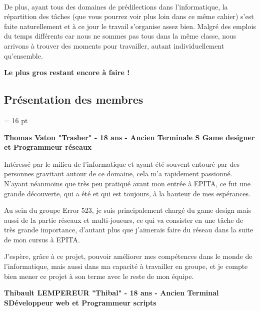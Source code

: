 \documentclass[12pt,a4paper]{article}
\begin{document}
\paragraph{}
De plus, ayant tous des domaines de prédilections dans l'informatique, la répartition des tâches (que vous pourrez voir plus loin dans ce même cahier) s'est faite naturellement et à ce jour le travail s'organise assez bien. Malgré des emplois du temps différents car nous ne sommes pas tous dans la même classe, nous arrivons à trouver des moments pour travailler, autant individuellement qu'ensemble.
\begin{center}
\textbf{Le plus gros restant encore à faire !}
\end{center}
\newpage
\subsection{Présentation des membres}
\baselineskip = 16 pt
\begin{center}
\textbf{Thomas Vaton "Trasher" - 18 ans - Ancien Terminale S\newline
Game designer et Programmeur réseaux}
\end{center}

Intéressé par le milieu de l'informatique et ayant été souvent entouré par des personnes gravitant autour de ce domaine, cela m'a rapidement passionné. N'ayant néanmoins que très peu pratiqué avant mon entrée à EPITA, ce fut une grande découverte, qui a été et qui est toujours, à la hauteur de mes espérances.

Au sein du groupe Error 523, je suis principalement chargé du game design mais aussi de la partie réseaux et multi-joueurs, ce qui va consister en une tâche de très grande importance, d'autant plus que j'aimerais faire du réseau dans la suite de mon cursus à EPITA.
   
J'espère, grâce à ce projet, pouvoir améliorer mes compétences dans le monde de l'informatique, mais aussi dans ma capacité à travailler en groupe, et je compte bien mener ce projet à son terme avec le reste de mon équipe.

\begin{center}
\textbf{Thibault LEMPEREUR "Thibal" - 18 ans - Ancien Terminal S\newline Développeur web et Programmeur scripts}

\end{center}
\end{document}

